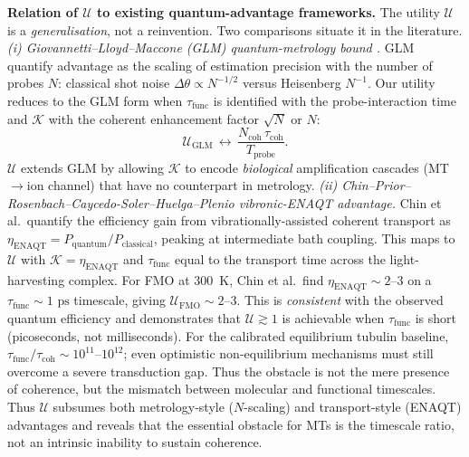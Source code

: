 \documentclass[twocolumn,10pt]{article}
\newcommand{\ps}{\text{~ps}}
\begin{document}
\textbf{Relation of $\mathcal{U}$ to existing quantum-advantage frameworks.}
The utility $\mathcal{U}$ is a \emph{generalisation}, not a reinvention.
Two comparisons situate it in the literature.
\emph{(i) Giovannetti--Lloyd--Maccone (GLM) quantum-metrology bound
\cite{Giovannetti2004}.} GLM quantify advantage as the scaling of
estimation precision with the number of probes $N$: classical shot noise
$\Delta\theta\propto N^{-1/2}$ versus Heisenberg $N^{-1}$. Our utility
reduces to the GLM form when $\tau_{\text{func}}$ is identified with the
probe-interaction time and $\mathcal{K}$ with the coherent enhancement
factor $\sqrt{N}$ or $N$:
\begin{equation}
\mathcal{U}_{\text{GLM}}\,\longleftrightarrow\,
\frac{N_{\text{coh}}\,\tau_{\text{coh}}}{T_{\text{probe}}}.
\end{equation}
$\mathcal{U}$ extends GLM by allowing $\mathcal{K}$ to encode
\emph{biological} amplification cascades (MT$\to$ion channel) that have no
counterpart in metrology.
\emph{(ii) Chin--Prior--Rosenbach--Caycedo-Soler--Huelga--Plenio
\cite{Chin2013} vibronic-ENAQT advantage.} Chin et al.\ quantify the
efficiency gain from vibrationally-assisted coherent transport as
$\eta_{\text{ENAQT}}=P_{\text{quantum}}/P_{\text{classical}}$, peaking at
intermediate bath coupling. This maps to $\mathcal{U}$ with
$\mathcal{K}=\eta_{\text{ENAQT}}$ and $\tau_{\text{func}}$ equal to the
transport time across the light-harvesting complex. For FMO at 300~K,
Chin et al.\ find $\eta_{\text{ENAQT}}\sim 2$--$3$ on a $\tau_{\text{func}}
\sim 1\ps$ timescale, giving $\mathcal{U}_{\text{FMO}}\sim 2$--$3$. This
is \emph{consistent} with the observed quantum efficiency and demonstrates
that $\mathcal{U}\gtrsim 1$ is achievable when $\tau_{\text{func}}$ is
short (picoseconds, not milliseconds). For the calibrated equilibrium tubulin baseline,
$\tau_{\text{func}}/\tau_{\text{coh}}\sim10^{11}$--$10^{12}$; even
optimistic non-equilibrium mechanisms must still overcome a severe
transduction gap. Thus the obstacle is not the mere presence of coherence,
but the mismatch between molecular and functional timescales.
Thus $\mathcal{U}$ subsumes both metrology-style ($N$-scaling) and
transport-style (ENAQT) advantages and reveals that the essential obstacle
for MTs is the timescale ratio, not an intrinsic inability to sustain
coherence.
\end{document}
